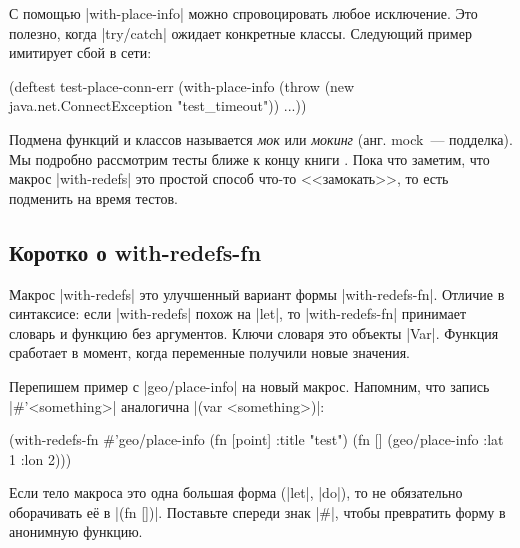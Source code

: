 С помощью \spverb|with-place-info| можно спровоцировать любое исключение. Это
полезно, когда \spverb|try/catch| ожидает конкретные классы. Следующий пример
имитирует сбой в сети:


\begin{english}
  \begin{clojure}
(deftest test-place-conn-err
  (with-place-info
    (throw (new java.net.ConnectException "test_timeout"))
    ...))
  \end{clojure}
\end{english}


Подмена функций и классов называется \emph{мок} или \emph{мокинг} (анг. mock~---
подделка). Мы подробно рассмотрим тесты ближе к концу
книги . Пока что заметим, что макрос \spverb|with-redefs|
это простой способ что-то <<замокать>>, то есть подменить на время тестов.

\subsection{Коротко о with-redefs-fn}


Макрос \spverb|with-redefs| это улучшенный вариант формы
\spverb|with-redefs-fn|. Отличие в синтаксисе: если \spverb|with-redefs| похож
на \spverb|let|, то \spverb|with-redefs-fn| принимает словарь и функцию без
аргументов. Ключи словаря это объекты \spverb|Var|. Функция сработает в момент,
когда переменные получили новые значения.

Перепишем пример с \spverb|geo/place-info| на новый макрос. Напомним, что запись
\spverb|#'<something>| аналогична \spverb|(var <something>)|:

\begin{english}
  \begin{clojure}
(with-redefs-fn
  {#'geo/place-info (fn [point] {:title "test"})}
  (fn []
    (geo/place-info {:lat 1 :lon 2})))
  \end{clojure}
\end{english}


Если тело макроса это одна большая форма (\spverb|let|, \spverb|do|), то не
обязательно оборачивать е\"{е} в \spverb|(fn [])|. Поставьте спереди знак
\spverb|#|, чтобы превратить форму в анонимную функцию.

